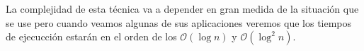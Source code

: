 La complejidad de esta técnica va a depender en gran medida de la situación que se use pero cuando veamos algunas de sus aplicaciones veremos que los tiempos de ejecucción estarán en el orden de los  $\mathcal{O}(\log n)$ y  $\mathcal{O}(\log^2 n)$.